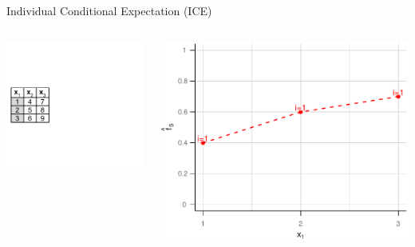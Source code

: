 \documentclass[11pt,compress,t,notes=noshow, xcolor=table]{beamer}
\begin{document}
\begin{vbframe}{Individual Conditional Expectation (ICE)}
\begin{columns}[T]
\begin{column}{0.55\textwidth}
\vspace*{-\topsep}
\vspace*{0.5\lineskip}
\includegraphics[page=6, trim=-3.69cm 0cm 3.69cm 0cm, width=\textwidth]{figure_man/ice_pd_plot_demo}
\end{column}
\begin{column}{0.45\textwidth}

\begin{center}
\includegraphics[page=2, width=\textwidth]{figure_man/ICE}
\end{center}


\end{column}
\end{columns}
\end{vbframe}
\end{document}
